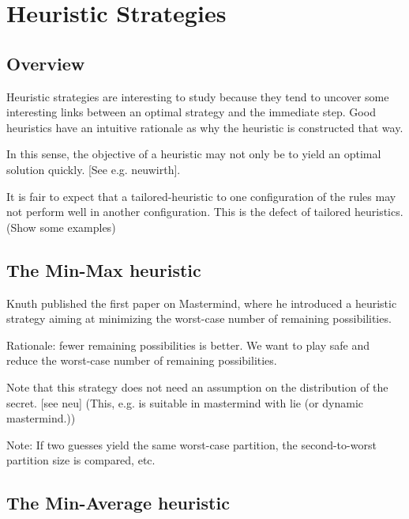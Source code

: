 \section{Heuristic Strategies}


\subsection{Overview}

Heuristic strategies are interesting to study because they tend to uncover some interesting links between an optimal strategy and the immediate step. Good heuristics have an intuitive rationale as why the heuristic is constructed that way.

In this sense, the objective of a heuristic may not only be to yield an optimal solution quickly. [See e.g. neuwirth].

It is fair to expect that a tailored-heuristic to one configuration of the rules may not perform well in another configuration. This is the defect of tailored heuristics. (Show some examples)

\subsection{The Min-Max heuristic}

Knuth \cite{knuth76} published the first paper on Mastermind, where he introduced a heuristic strategy aiming at minimizing the worst-case number of remaining possibilities.

Rationale: fewer remaining possibilities is better. We want to play safe and reduce the worst-case number of remaining possibilities. 

Note that this strategy does not need an assumption on the distribution of the secret. [see neu] (This, e.g. is suitable in mastermind with lie (or dynamic mastermind.))

Note: If two guesses yield the same worst-case partition, the second-to-worst partition size is compared, etc.

\subsection{The Min-Average heuristic}

